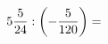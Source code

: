\documentclass[preview]{standalone}
\begin{document}
\begin{align*}
5 { 5 \over 24 }  :  \left( - { 5 \over 120 } \right)  =
\end{align*}
\end{document}
